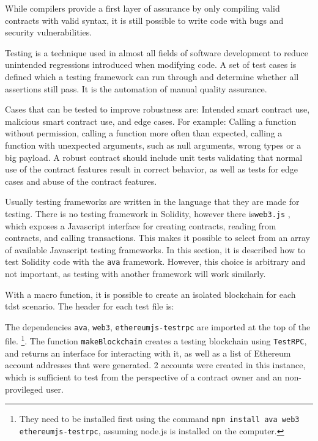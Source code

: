 While compilers provide a first layer of assurance by only compiling valid contracts with valid syntax, it is still possible to write code with bugs and security vulnerabilities.

Testing is a technique used in almost all fields of software development to reduce unintended regressions introduced when modifying code. A set of test cases is defined which a testing framework can run through and determine whether all assertions still pass. It is the automation of manual quality assurance.

Cases that can be tested to improve robustness are: Intended smart contract use, malicious smart contract use, and edge cases. For example: Calling a function without permission, calling a function more often than expected, calling a function with unexpected arguments, such as null arguments, wrong types or a big payload.
A robust contract should include unit tests validating that normal use of the contract features result in correct behavior, as well as tests for edge cases and abuse of the contract features.

Usually testing frameworks are written in the language that they are made for testing. There is no testing framework in  Solidity, however there is\texttt{web3.js} \cite{web3}, which exposes a Javascript interface for creating contracts, reading from contracts, and calling transactions. This makes it possible to select from an array of available Javascript testing frameworks. In this section, it is described how to test Solidity code with the \texttt{ava} framework. However, this choice is arbitrary and not important, as testing with another framework will work similarly.

With a macro function, it is possible to create an isolated blockchain for each tdst scenario. The header for each test file is:



The dependencies \texttt{ava}, \texttt{web3}, \texttt{ethereumjs-testrpc} are imported at the top of the file. \footnote{They need to be installed first using the command \texttt{npm install ava web3 ethereumjs-testrpc}, assuming node.js is installed on the computer.}. The function \texttt{makeBlockchain} creates a testing blockchain using \texttt{TestRPC}, and returns an interface for interacting with it, as well as a list of Ethereum account addresses that were generated. 2 accounts were created in this instance, which is sufficient to test from the perspective of a contract owner and an non-provileged user.

